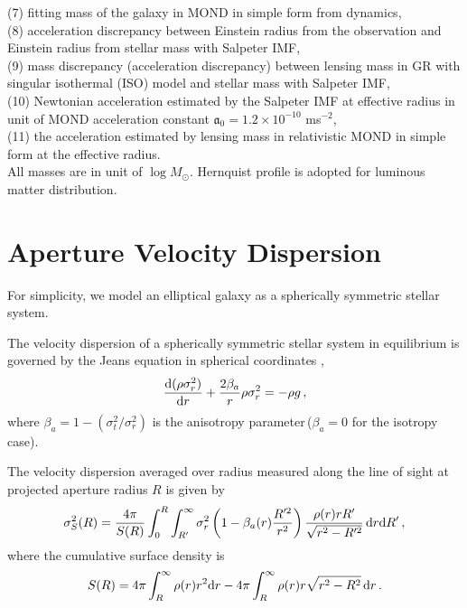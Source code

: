 \documentclass[fleqn,usenatbib,useAMS]{mnras}
\begin{document}
\begin{table*}
\begin{tablenotes}
            (7) fitting mass of the galaxy in MOND in simple form from dynamics,                            \\
            (8) acceleration discrepancy between Einstein radius from the observation and Einstein radius from stellar mass with Salpeter IMF,    \\
            (9) mass discrepancy (acceleration discrepancy) between lensing mass in GR with singular isothermal (ISO) model and stellar mass with Salpeter IMF,    \\
            (10) Newtonian acceleration estimated by the Salpeter IMF at effective radius in unit of MOND acceleration constant $\mathfrak{a}_0=1.2\times10^{-10}$ ms$^{-2}$,  \\
            (11) the acceleration estimated by lensing mass in relativistic MOND in simple form at the effective radius. \\
            All masses are in unit of $\log{M}_{\odot}$.
            Hernquist profile \citep{Hernquist90} is adopted for luminous matter distribution.
    \end{tablenotes}
    \end{table*}

    \appendix
    \section{Aperture Velocity Dispersion}\label{sec:Jeans}

    For simplicity, we model an elliptical galaxy as a spherically symmetric stellar system.

        The velocity dispersion of a spherically symmetric stellar system in equilibrium is governed by the Jeans equation in spherical coordinates \citep{Binney08},
        \begin{equation}
        \label{eq:Jeans}
        \frac{{\rm d}(\rho\sigma_r^2)}{{\rm d}r}+\frac{2\beta_a}{r}\rho\sigma_r^2=-\rho g\,,
        \end{equation}
        where $\beta_a=1-(\sigma_t^2/\sigma_r^2)$ is the anisotropy parameter\,($\beta_a=0$ for the isotropy case).

        The velocity dispersion averaged over radius measured along the line of sight at projected aperture radius $R$ is given by
        \begin{equation}
        \label{eq:vel_I}
        \sigma_S^2(R)=\frac{4\pi}{S(R)}\int_{0}^{R}\int_{R'}^{\infty}\sigma_r^2\left(1-\beta_a(r)\frac{R'^2}{r^2}\right)
        \frac{\rho(r)rR'}{\sqrt{r^2-R'^2}}\,{\rm d}r{\rm d}R'\,,
        \end{equation}
        where the cumulative surface density is
        \begin{equation}
        \label{eq:surface}
        S(R)=4\pi\int_{R}^{\infty}\rho(r)r^2{\rm d}r-4\pi\int_{R}^{\infty}\rho(r) r\sqrt{r^2-R^2}\,{\rm d}r\,.
        \end{equation}
\end{document}
